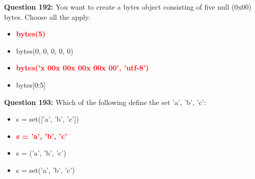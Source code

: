 \documentclass[12pt,a4paper]{article}
\begin{document}
\vspace{0.5cm}

\textbf{Question 192:} You want to create a bytes object consisting of five null (0x00) bytes. Choose all the apply.

\begin{itemize}
    \item[\textbf{A.}] \textcolor{red}{\textbf{bytes(5)}}
    \item[\textbf{B.}] bytes(0, 0, 0, 0, 0)
    \item[\textbf{C.}] \textcolor{red}{\textbf{bytes('x 00x 00x 00x 00x 00', 'utf-8')}}
    \item[\textbf{D.}] bytes[0:5]
\end{itemize}

\vspace{0.5cm}

\textbf{Question 193:} Which of the following define the set 'a', 'b', 'c':

\begin{itemize}
    \item[\textbf{A.}] s = set(['a', 'b', 'c'])
    \item[\textbf{B.}] \textcolor{red}{\textbf{s = 'a', 'b', 'c'}}
    \item[\textbf{C.}] s = ('a', 'b', 'c')
    \item[\textbf{D.}] s = set('a', 'b', 'c')
\end{itemize}

\vspace{0.5cm}
\end{document}
